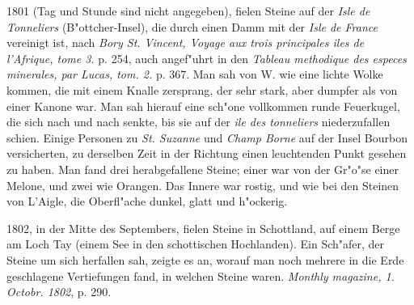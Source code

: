 \documentclass[a4paper, 11pt, oneside, polutonikogreek, german]{article}
\begin{document}
1801 (Tag und Stunde sind nicht angegeben), fielen Steine auf der \emph{Isle de Tonneliers} (B"ottcher-Insel), die durch einen Damm mit der \emph{Isle de France} vereinigt ist, nach \emph{Bory St. Vincent, Voyage aux trois principales iles de l'Afrique, tome 3.} p. 254, auch angef"uhrt in den \emph{Tableau methodique des especes minerales, par Lucas, tom. 2.} p. 367. Man sah von W. wie eine lichte Wolke kommen, die mit einem Knalle zersprang, der sehr stark, aber dumpfer als von einer Kanone war. Man sah hierauf eine sch"one vollkommen runde Feuerkugel, die sich nach und nach senkte, bis sie auf der \emph{ile des tonneliers} niederzufallen schien. Einige Personen zu \emph{St. Suzanne} und \emph{Champ Borne} auf der Insel Bourbon versicherten, zu derselben Zeit in der Richtung einen leuchtenden Punkt gesehen zu haben. Man fand drei herabgefallene Steine; einer war von der Gr"o"se einer Melone, und zwei wie Orangen. Das Innere war rostig, und wie bei den Steinen von L'Aigle, die Oberfl"ache dunkel, glatt und h"ockerig.

1802, in der Mitte des Septembers, fielen Steine in Schottland, auf einem Berge am Loch Tay (einem See in den schottischen Hochlanden). Ein Sch"afer, der Steine um sich herfallen sah, zeigte es an, worauf man noch mehrere in die Erde geschlagene Vertiefungen fand, in welchen Steine waren. \emph{Monthly magazine, 1. Octobr. 1802}, p. 290.
\end{document}
